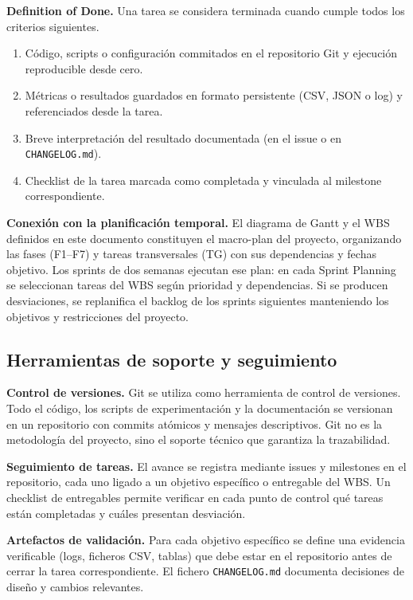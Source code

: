 \textbf{Definition of Done.} Una tarea se considera terminada cuando cumple todos los criterios siguientes.
\begin{enumerate}[nosep,leftmargin=*]
\item Código, scripts o configuración commitados en el repositorio Git y ejecución reproducible desde cero.
\item Métricas o resultados guardados en formato persistente (CSV, JSON o log) y referenciados desde la tarea.
\item Breve interpretación del resultado documentada (en el issue o en \texttt{CHANGELOG.md}).
\item Checklist de la tarea marcada como completada y vinculada al milestone correspondiente.
\end{enumerate}

\textbf{Conexión con la planificación temporal.} El diagrama de Gantt y el WBS definidos en este documento constituyen el macro-plan del proyecto, organizando las fases (F1--F7) y tareas transversales (TG) con sus dependencias y fechas objetivo. Los sprints de dos semanas ejecutan ese plan: en cada Sprint Planning se seleccionan tareas del WBS según prioridad y dependencias. Si se producen desviaciones, se replanifica el backlog de los sprints siguientes manteniendo los objetivos y restricciones del proyecto.

\subsection{Herramientas de soporte y seguimiento}

\textbf{Control de versiones.} Git se utiliza como herramienta de control de versiones. Todo el código, los scripts de experimentación y la documentación se versionan en un repositorio con commits atómicos y mensajes descriptivos. Git no es la metodología del proyecto, sino el soporte técnico que garantiza la trazabilidad.

\textbf{Seguimiento de tareas.} El avance se registra mediante issues y milestones en el repositorio, cada uno ligado a un objetivo específico o entregable del WBS. Un checklist de entregables permite verificar en cada punto de control qué tareas están completadas y cuáles presentan desviación.

\textbf{Artefactos de validación.} Para cada objetivo específico se define una evidencia verificable (logs, ficheros CSV, tablas) que debe estar en el repositorio antes de cerrar la tarea correspondiente. El fichero \texttt{CHANGELOG.md} documenta decisiones de diseño y cambios relevantes.

